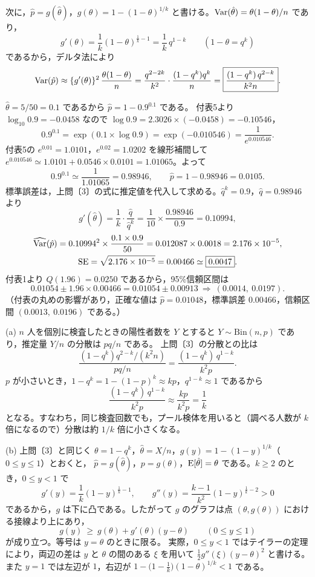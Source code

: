 \documentclass[a4paper,11pt]{ltjsarticle}
\begin{document}
次に，$\hat p=g(\hat\theta)$，$g(\theta)=1-(1-\theta)^{1/k}$ と書ける。$\operatorname{Var}(\hat\theta)=\theta(1-\theta)/n$ であり，
\[
g'(\theta)=\frac1k(1-\theta)^{\frac1k-1}=\frac1k\,q^{1-k}\qquad(1-\theta=q^k)
\]
であるから，デルタ法により
\[
\operatorname{Var}(\hat p)\approx\{g'(\theta)\}^2\,\frac{\theta(1-\theta)}{n}=\frac{q^{2-2k}}{k^2}\cdot\frac{(1-q^k)q^k}{n}
=\boxed{\frac{(1-q^k)\,q^{2-k}}{k^2n}}.
\]

$\hat\theta=5/50=0.1$ であるから $\hat p=1-0.9^{0.1}$ である。
付表5より $\log_{10}0.9=-0.0458$ なので $\log0.9=2.3026\times(-0.0458)=-0.10546$，
\[
0.9^{0.1}=\exp(0.1\times\log0.9)=\exp(-0.010546)=\frac{1}{e^{0.010546}}.
\]
付表5の $e^{0.01}=1.0101$，$e^{0.02}=1.0202$ を線形補間して $e^{0.010546}\simeq1.0101+0.0546\times0.0101=1.01065$。よって
\[
0.9^{0.1}\simeq\frac{1}{1.01065}=0.98946,\qquad \hat p=1-0.98946=\boxed{0.0105}.
\]
標準誤差は，上問〔3〕の式に推定値を代入して求める。$\hat q^{k}=0.9$，$\hat q=0.98946$ より
\[
g'(\hat\theta)=\frac1k\cdot\frac{\hat q}{\hat q^{k}}=\frac{1}{10}\times\frac{0.98946}{0.9}=0.10994,
\]
\begin{gather*}
\widehat{\operatorname{Var}}(\hat p)=0.10994^2\times\frac{0.1\times0.9}{50}=0.012087\times0.0018=2.176\times10^{-5},\\
\mathrm{SE}=\sqrt{2.176\times10^{-5}}=0.00466\simeq\boxed{0.0047}.
\end{gather*}
付表1より $Q(1.96)=0.0250$ であるから，95\%信頼区間は
\[
0.01054\pm1.96\times0.00466=0.01054\pm0.00913\ \Longrightarrow\ \boxed{(0.0014,\ 0.0197)}.
\]
（付表の丸めの影響があり，正確な値は $\hat p=0.01048$，標準誤差 $0.00466$，信頼区間 $(0.0013,\ 0.0196)$ である。）

(a) $n$ 人を個別に検査したときの陽性者数を $Y$ とすると $Y\sim\mathrm{Bin}(n,p)$ であり，推定量 $Y/n$ の分散は $pq/n$ である。
上問〔3〕の分散との比は
\[
\frac{(1-q^k)q^{2-k}/(k^2n)}{pq/n}=\boxed{\frac{(1-q^k)\,q^{1-k}}{k^2p}}.
\]
$p$ が小さいとき，$1-q^k=1-(1-p)^k\approx kp$，$q^{1-k}\approx1$ であるから
\[
\frac{(1-q^k)\,q^{1-k}}{k^2p}\approx\frac{kp}{k^2p}=\frac1k
\]
となる。すなわち，同じ検査回数でも，プール検体を用いると（調べる人数が $k$ 倍になるので）分散は約 $1/k$ 倍に小さくなる。

(b) 上問〔3〕と同じく $\theta=1-q^k$，$\hat\theta=X/n$，$g(y)=1-(1-y)^{1/k}$（$0\le y\le1$）とおくと，
$\hat p=g(\hat\theta)$，$p=g(\theta)$，$\operatorname{E}[\hat\theta]=\theta$ である。$k\ge2$ のとき，$0\le y<1$ で
\[
g'(y)=\frac1k(1-y)^{\frac1k-1},\qquad g''(y)=\frac{k-1}{k^2}(1-y)^{\frac1k-2}>0
\]
であるから，$g$ は下に凸である。したがって $g$ のグラフは点 $(\theta,g(\theta))$ における接線より上にあり，
\[
g(y)\ \ge\ g(\theta)+g'(\theta)(y-\theta)\qquad(0\le y\le1)
\]
が成り立つ。等号は $y=\theta$ のときに限る。
実際，$0\le y<1$ ではテイラーの定理により，両辺の差は $y$ と $\theta$ の間のある $\xi$ を用いて $\frac12g''(\xi)(y-\theta)^2$ と書ける。
また $y=1$ では左辺が $1$，右辺が $1-\bigl(1-\frac1k\bigr)(1-\theta)^{1/k}<1$ である。
\end{document}

